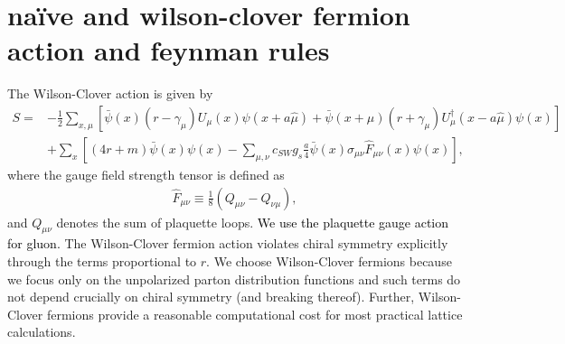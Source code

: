 \documentclass[english,preprint,aps,prd,showpacs,superscriptaddress,nofootinbib,tightenlines]{revtex4}
\newcommand{\emphz}[1]{\textcolor{black}{#1}}
\begin{document}
\section{na\"ive and wilson-clover fermion action and feynman rules}

The Wilson-Clover action is given by
\begin{align}
S= & -\frac{1}{2}\sum_{x,\mu}\left[\bar{\psi}\left(x\right)\left(r-\gamma_{\mu}\right)U_{\mu}\left(x\right)\psi\left(x+a\hat{\mu}\right)+\bar{\psi}\left(x+\mu\right)\left(r+\gamma_{\mu}\right)U_{\mu}^{\dagger}\left(x-a\hat{\mu}\right)\psi\left(x\right)\right]\nonumber \\
 & +\sum_{x}\left[\left(4r+m\right)\bar{\psi}\left(x\right)\psi\left(x\right)-\sum_{\mu,\nu}c_{SW}g_{s}\frac{a}{4}\bar{\psi}\left(x\right)\sigma_{\mu\nu}\hat{F}_{\mu\nu}\left(x\right)\psi\left(x\right)\right],
\end{align}
where the gauge field strength tensor is defined as
\begin{align}
\hat{F}_{\mu\nu}\equiv\frac{1}{8}\left(Q_{\mu\nu}-Q_{\nu\mu}\right),
\end{align}
and $Q_{\mu\nu}$ denotes the sum of plaquette loops. \emphz{We use the plaquette gauge action for gluon.} The Wilson-Clover
fermion action violates chiral symmetry explicitly through the terms
proportional to $r$. We choose Wilson-Clover fermions because
we focus only on the unpolarized parton distribution functions and such terms do not depend crucially on chiral symmetry (and breaking thereof).
Further, Wilson-Clover fermions provide a reasonable computational cost for
most practical lattice calculations.
\end{document}
